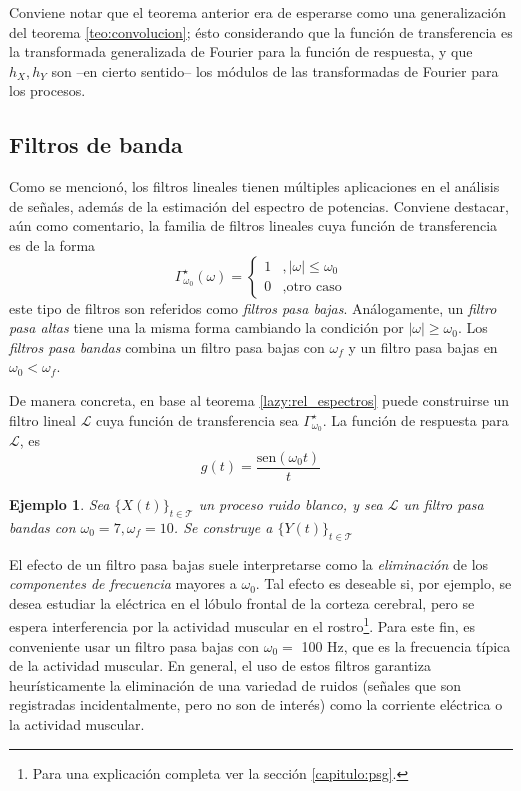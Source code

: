 \documentclass[12pt,letterpaper]{book}
\newtheorem{ejemplo}{Ejemplo}[chapter]
\newcommand{\SEN}[1]{\mathrm{sen}\left( #1 \right)}
\newcommand{\abso}[1]{\left| #1 \right|}
\newcommand{\xt}{$\{X(t)\}_{t\in \mathcal{T}}$ }
\newcommand{\hz}{\si{\hertz}\xspace}
\begin{document}
Conviene notar que el teorema anterior era de esperarse como una generalización del teorema \ref{teo:convolucion}; ésto considerando que la función de transferencia es la transformada generalizada de Fourier para la función de respuesta, y que $h_X, h_Y$ son --en cierto sentido-- los módulos de las transformadas de Fourier para los procesos.

\subsection{Filtros de banda}

Como se mencionó, los filtros lineales tienen múltiples aplicaciones en el análisis de señales, además de la estimación del espectro de potencias.
%
Conviene destacar, aún como comentario, la familia de filtros lineales cuya función de transferencia es de la forma
\begin{equation}
\Gamma_{\omega_0}^{\star} (\omega) = \begin{cases}
1 &, \abso{\omega} \leq \omega_0 \\
0 &, \text{otro caso}
\end{cases}
\end{equation}
este tipo de filtros son referidos como \textit{filtros pasa bajas}.
%
Análogamente, un \textit{filtro pasa altas} tiene una la misma forma cambiando la condición por $\abso{\omega} \geq \omega_0$.
%
Los \textit{filtros pasa bandas} combina un filtro pasa bajas con $\omega_f$ y un filtro pasa bajas en $\omega_0 < \omega_f$.

De manera concreta, en base al teorema \ref{lazy:rel_espectros} puede construirse un filtro lineal $\mathcal{L}$ cuya función de transferencia sea $\Gamma_{\omega_0}^{\star}$.
%
La función de respuesta para $\mathcal{L}$, es
\begin{equation}
g(t) = \frac{\SEN{\omega_0 t}}{t}
\end{equation}

\begin{ejemplo}
Sea \xt un proceso ruido blanco, y sea $\mathcal{L}$ un filtro pasa bandas con $\omega_0 = 7, \omega_f = 10$. Se construye a $\{Y(t)\}_{t\in \mathcal{T}}$
\label{lazy:proceso_alfa}
\end{ejemplo}

El efecto de un filtro pasa bajas suele interpretarse como la \textit{eliminación} de los \textit{componentes de frecuencia} mayores a $\omega_0$. 
%
Tal efecto es deseable si, por ejemplo, se desea estudiar la eléctrica en el lóbulo frontal de la corteza cerebral, pero se espera interferencia por la actividad muscular en el rostro\footnote{Para una explicación completa ver la sección \ref{capitulo:psg}.}.
%
Para este fin, es conveniente usar un filtro pasa bajas con $\omega_0 = $ 100 \hz, que es la frecuencia típica de la actividad muscular.
%
%
En general, el uso de estos filtros garantiza heurísticamente la eliminación de una variedad de ruidos (señales que son registradas incidentalmente, pero no son de interés) como la corriente eléctrica o la actividad muscular.
\end{document}
